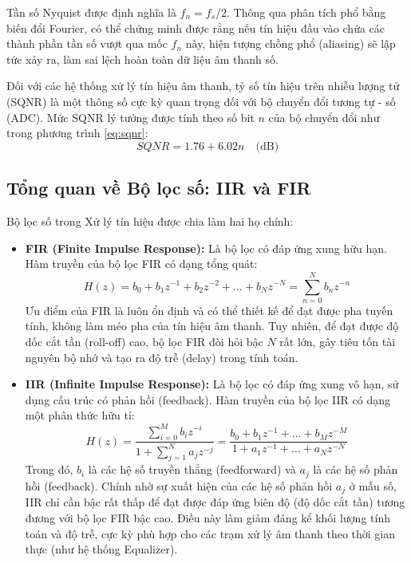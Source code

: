 \documentclass[12pt,a4paper]{article}
\begin{document}
Tần số Nyquist được định nghĩa là $f_n = f_s/2$. Thông qua phân tích phổ bằng biến đổi Fourier, có thể chứng minh được rằng nếu tín hiệu đầu vào chứa các thành phần tần số vượt qua mốc $f_n$ này, hiện tượng chồng phổ (aliasing) sẽ lập tức xảy ra, làm sai lệch hoàn toàn dữ liệu âm thanh số.

Đối với các hệ thống xử lý tín hiệu âm thanh, tỷ số tín hiệu trên nhiễu lượng tử (SQNR) là một thông số cực kỳ quan trọng đối với bộ chuyển đổi tương tự - số (ADC). Mức SQNR lý tưởng được tính theo số bit $n$ của bộ chuyển đổi như trong phương trình \ref{eq:sqnr}:
\begin{equation} \label{eq:sqnr}
    SQNR = 1.76 + 6.02n \quad \text{(dB)}
\end{equation}

\subsection{Tổng quan về Bộ lọc số: IIR và FIR}
Bộ lọc số trong Xử lý tín hiệu được chia làm hai họ chính:
\begin{itemize}
    \item \textbf{FIR (Finite Impulse Response):} Là bộ lọc có đáp ứng xung hữu hạn. Hàm truyền của bộ lọc FIR có dạng tổng quát:
    \begin{equation}
        H(z) = b_0 + b_1 z^{-1} + b_2 z^{-2} + \dots + b_N z^{-N} = \sum_{n=0}^{N} b_n z^{-n}
    \end{equation}
    Ưu điểm của FIR là luôn ổn định và có thể thiết kế để đạt được pha tuyến tính, không làm méo pha của tín hiệu âm thanh. Tuy nhiên, để đạt được độ dốc cắt tần (roll-off) cao, bộ lọc FIR đòi hỏi bậc $N$ rất lớn, gây tiêu tốn tài nguyên bộ nhớ và tạo ra độ trễ (delay) trong tính toán.
    
    \item \textbf{IIR (Infinite Impulse Response):} Là bộ lọc có đáp ứng xung vô hạn, sử dụng cấu trúc có phản hồi (feedback). Hàm truyền của bộ lọc IIR có dạng một phân thức hữu tỉ:
    \begin{equation}
        H(z) = \frac{\sum_{i=0}^{M} b_i z^{-i}}{1 + \sum_{j=1}^{N} a_j z^{-j}} = \frac{b_0 + b_1 z^{-1} + \dots + b_M z^{-M}}{1 + a_1 z^{-1} + \dots + a_N z^{-N}}
    \end{equation}
    Trong đó, $b_i$ là các hệ số truyền thẳng (feedforward) và $a_j$ là các hệ số phản hồi (feedback). Chính nhờ sự xuất hiện của các hệ số phản hồi $a_j$ ở mẫu số, IIR chỉ cần bậc rất thấp để đạt được đáp ứng biên độ (độ dốc cắt tần) tương đương với bộ lọc FIR bậc cao. Điều này làm giảm đáng kể khối lượng tính toán và độ trễ, cực kỳ phù hợp cho các trạm xử lý âm thanh theo thời gian thực (như hệ thống Equalizer).
\end{itemize}
\end{document}
